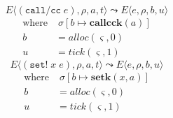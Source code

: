 \documentclass[12pt,draft]{article}
\newcommand{\callccsyn}[1]{(\texttt{call/cc}\;#1)}
\newcommand{\setsyn}[2]{(\texttt{set!}\;#1\;#2)}
\begin{document}
\begin{multicols*}{2}
\[
E\langle
\callccsyn{e} , \rho , a , t
\rangle
\leadsto
E\langle
e , \rho , b , u
\rangle
\]
\vspace{-11mm}
\begin{align*}
\text{where}&\; \sigma[b \mapsto \textbf{callcck}(a)] \\
b &= alloc(\varsigma, 0) \\
u &= tick(\varsigma, 1)
\end{align*}
\vspace{-5mm}
\[
E\langle
\setsyn{x}{e} , \rho , a , t
\rangle
\leadsto
E\langle
e , \rho , b , u
\rangle
\]
\vspace{-11mm}
\begin{align*}
\text{where}&\; \sigma[b \mapsto \textbf{setk}(x, a)] \\
b &= alloc(\varsigma, 0) \\
u &= tick(\varsigma, 1)
\end{align*}


\vfill\null
\columnbreak


\end{multicols*}
\end{document}
